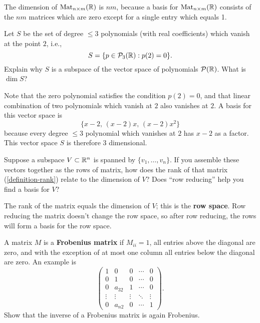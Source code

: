 \documentclass{homework}
\begin{document}
\begin{solution}
  The dimension of $\operatorname{Mat}_{n \times m}(\mathbb{R})$ is $nm$, because a basis
  for $\operatorname{Mat}_{n \times m}(\mathbb{R})$ consists of the $nm$ matrices which are
  zero except for a single entry which equals 1.
\end{solution}

\begin{problem}
  Let $S$ be the set of degree $\leq 3$ polynomials (with real
  coefficients) which vanish at the point $2$, i.e.,
  \[ S = \{ p \in \mathcal{P}_{3}(\mathbb{R}) : p(2) = 0 \}. \] Explain
  why $S$ is a subspace of the vector space of polynomials
  $\mathcal{P}(\mathbb{R})$.  What is $\dim S$?
\end{problem}

\begin{solution}
  Note that the zero polynomial satisfies the condition $p(2) = 0$,
  and that linear combination of two polynomials which vanish at $2$
  also vanishes at $2$.  A basis for this vector space is
  \[
    \{ x-2,\, (x-2)x,\, (x-2)x^2 \}
  \]
  because every degree $\leq 3$ polynomial which vanishes at $2$ has
  $x-2$ as a factor.  This vector space $S$ is therefore 3 dimensional.
\end{solution}

\begin{problem}
  Suppose a subspace $V \subset \mathbb{R}^n$ is spanned by
  $\{v_1,\ldots,v_n\}$.  If you assemble these vectors together as the
  rows of matrix, how does the rank of that matrix
  (\ref{definition-rank}) relate to the dimension of $V$?  Does ``row
  reducing'' help you find a basis for $V$?
\end{problem}

\begin{solution}
  The rank of the matrix equals the dimension of $V$; this is the
  \textbf{row space}.  Row reducing the matrix doesn't change the row
  space, so after row reducing, the rows will form a basis for the row
  space.
\end{solution}

\begin{problem}\label{frobenius-matrix}A matrix $M$ is a \textbf{Frobenius matrix} if $M_{ii} = 1$, all
  entries above the diagonal are zero, and with the exception of at
  most one column all entries below the diagonal are zero.  An example is
  \[\begin{pmatrix}
      1&0&0&\cdots &0\\
      0&1&0&\cdots &0\\
      0&a_{32}&1&\cdots &0\\
      \vdots &\vdots &\vdots &\ddots &\vdots \\
      0&a_{n2}&0&\cdots &1
    \end{pmatrix}.\]
  Show that the inverse of a Frobenius matrix is again Frobenius.
\end{problem}
\end{document}
